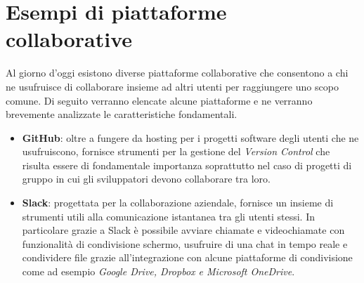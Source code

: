 \section{Esempi di piattaforme collaborative}
Al giorno d'oggi esistono diverse piattaforme collaborative che consentono a chi ne usufruisce di collaborare insieme ad altri utenti per raggiungere uno scopo comune. Di seguito verranno elencate alcune piattaforme e ne verranno brevemente analizzate le caratteristiche fondamentali.
\begin{itemize}
    \item{\textbf{GitHub}: oltre a fungere da hosting per i progetti software degli utenti che ne usufruiscono, fornisce strumenti per la gestione del \emph{Version Control} che risulta essere di fondamentale importanza soprattutto nel caso di progetti di gruppo in cui gli sviluppatori devono collaborare tra loro.}
    \item{\textbf{Slack}: progettata per la collaborazione aziendale, fornisce un insieme di strumenti utili alla comunicazione istantanea tra gli utenti stessi. In particolare grazie a Slack è possibile avviare chiamate e videochiamate con funzionalità di condivisione schermo, usufruire di una chat in tempo reale e condividere file grazie all'integrazione con alcune piattaforme di condivisione come ad esempio \emph{Google Drive, Dropbox e Microsoft OneDrive}.}
\end{itemize}
